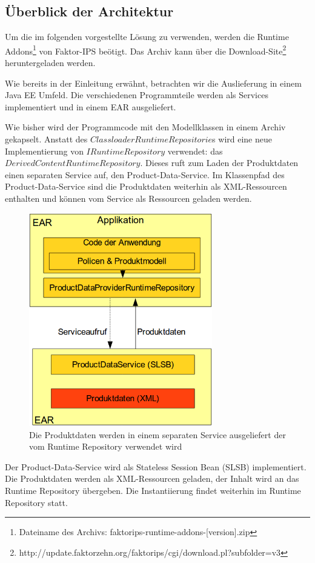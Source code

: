 \documentclass[headsepline=true, footsepline=true]{scrartcl}
\begin{document}
\subsection{Überblick der Architektur}

Um die im folgenden vorgestellte Lösung zu verwenden, werden
die Runtime Addons\footnote{Dateiname des Archivs:
faktorips-runtime-addons-[version].zip} von Faktor-IPS beötigt. Das Archiv kann
über die Download-Site\footnote{http://update.faktorzehn.org/faktorips/cgi/download.pl?subfolder=v3} heruntergeladen werden.

Wie bereits in der Einleitung erwähnt, betrachten wir die Auslieferung in einem
Java EE Umfeld. Die verschiedenen Programmteile werden als Services implementiert
und in einem EAR ausgeliefert.

Wie bisher wird der Programmcode mit den Modellklassen in einem Archiv gekapselt.
Anstatt des $ClassloaderRuntimeRepositorie$s wird eine neue Implementierung von
$IRuntimeRepository$ verwendet: das $DerivedContentRuntimeRepository$. Dieses
ruft zum Laden der Produktdaten einen separaten Service auf, den
Product-Data-Service. Im Klassenpfad des Product-Data-Service sind die
Produktdaten weiterhin als XML-Ressourcen enthalten und können vom Service als
Ressourcen geladen werden.

\begin{figure}[htb] \centering
\includegraphics[width=8cm]{./pics/service_architecture.png} \caption{Die
Produktdaten werden in einem separaten Service ausgeliefert der vom Runtime
Repository verwendet wird}
\label{service_architecture}
\end{figure}

Der Product-Data-Service wird als Stateless Session Bean (SLSB) implementiert.
Die Produktdaten werden als XML-Ressourcen geladen, der Inhalt wird an das
Runtime Repository übergeben. Die Instantiierung findet weiterhin im Runtime
Repository statt.
\end{document}
